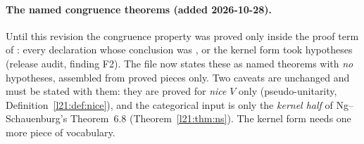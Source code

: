 \paragraph{The named congruence theorems (added 2026-10-28).} Until this revision the congruence property was proved only
inside the proof term of : every declaration whose conclusion was ,
 or the kernel form  took hypotheses (release audit, finding F2).
The file  now states these as named theorems with \emph{no}
hypotheses, assembled from proved pieces only. Two caveats are unchanged and must be stated with them: they are proved for
\emph{nice} $V$ only (pseudo-unitarity, Definition~\ref{l21:def:nice}), and the categorical input is only the \emph{kernel half}
of Ng--Schauenburg's Theorem~6.8 (Theorem~\ref{l21:thm:ns}). The kernel form needs one more piece of vocabulary.

